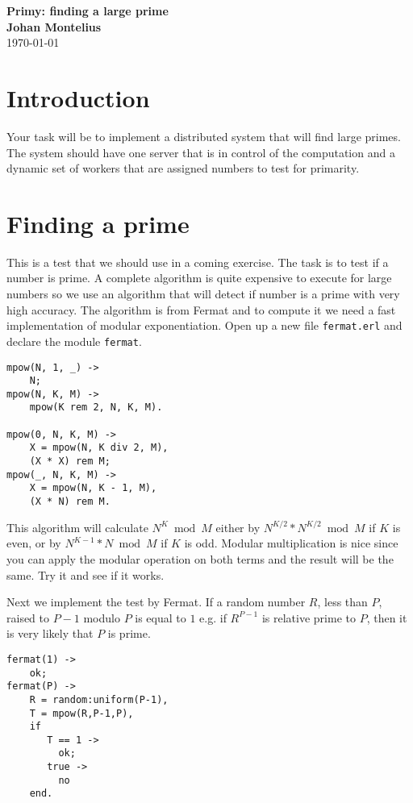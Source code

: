 \documentclass[a4paper,11pt]{article}
\newcommand{\nnsection}[1]{
\section*{#1}
\addcontentsline{toc}{section}{#1}
}
\begin{document}
\begin{center}
\vspace{20pt}
\textbf{\large Primy: finding a large prime}\\
\vspace{10pt}
\textbf{Johan Montelius}\\
\vspace{10pt}
\today{}
\end{center}

\nnsection{Introduction}

Your task will be to implement a distributed system that will find
large primes. The system should have one server that is in control of the
computation and a dynamic set of workers that are assigned numbers to
test for primarity.


\section{Finding a prime}

This is a test that we should use in a coming exercise. The task is to
test if a number is prime. A complete algorithm is quite expensive to
execute for large numbers so we use an algorithm that will detect if
number is a prime with very high accuracy. The algorithm is from
Fermat and to compute it we need a fast implementation of modular
exponentiation. Open up a new file {\tt fermat.erl} and declare the
module {\tt fermat}.


\begin{verbatim}	    
mpow(N, 1, _) ->
    N;
mpow(N, K, M) -> 
    mpow(K rem 2, N, K, M).

mpow(0, N, K, M) -> 
    X = mpow(N, K div 2, M),
    (X * X) rem M;
mpow(_, N, K, M) ->
    X = mpow(N, K - 1, M),
    (X * N) rem M.
\end{verbatim}	    

This algorithm will calculate $N^K \bmod M$ either by $N^{K/2}*N^{K/2}
\bmod M$ if $K$ is even, or by $N^{K-1}*N \bmod M$ if $K$ is odd. Modular
multiplication is nice since you can apply the modular operation on
both terms and the result will be the same. Try it and see if it works. 

Next we implement the test by Fermat. If a random number $R$, less than
$P$, raised to $P-1$ modulo $P$ is equal to $1$ e.g. if $R^{P-1}$ is
relative prime to $P$, then it is very likely that $P$ is prime.

\begin{verbatim}
fermat(1) ->
    ok;
fermat(P) ->
    R = random:uniform(P-1),
    T = mpow(R,P-1,P),
    if
       T == 1 ->
         ok;
       true ->
         no
    end.
\end{verbatim}	    
\end{document}
